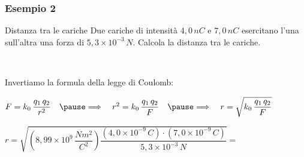 \documentclass[]{beamer}
\theoremstyle{plain}
\begin{document}
\begin{frame}
\frametitle{Esempio 2}
\begin{exampleblock}{Distanza tra le cariche}
{\small Due cariche di intensità $ 4,0 \, nC $ e $ 7,0 \, nC $ esercitano l'una sull'altra una forza di $ 5,3 \times 10^{-3} \, N $. Calcola la distanza tra le cariche.
}
\end{exampleblock}\pause

~

Invertiamo la formula della legge di Coulomb:
\begin{center}
$ F = k_0 \,  \dfrac{q_1 \, q_2}{r^2} ~~~\pause\Longrightarrow~~~ r^2 = k_0 \,  \dfrac{q_1 \, q_2}{F} ~~~\pause\Longrightarrow~~~ r = \sqrt{k_0 \,  \dfrac{q_1 \, q_2}{F}} $
\end{center}\pause
\begin{center}
$ r =  \sqrt{\left( 8,99 \times 10^9 \, \dfrac{Nm^2}{C^2} \right) \dfrac{\left( 4,0 \times 10^{-9} \, C \right)\cdot\left( 7,0 \times 10^{-9} \, C \right)}{5,3 \times 10^{-3} \, N}} = $
\end{center}\pause
\begin{center}
\end{center}
\end{frame}
\end{document}
